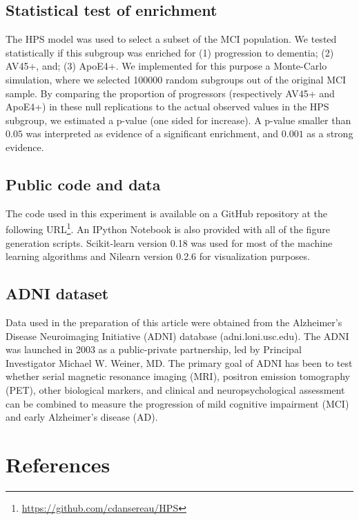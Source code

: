 \documentclass[authoryear]{elsarticle}
\begin{document}
\subsection*{Statistical test of enrichment }
The HPS model was used to select a subset of the MCI population. We tested statistically if this subgroup was enriched for (1) progression to dementia; (2) AV45+, and; (3) ApoE4+. We implemented for this purpose a Monte-Carlo simulation, where we selected 100000 random subgroups out of the original MCI sample. By comparing the proportion of progressors (respectively AV45+ and ApoE4+) in these null replications to the actual observed values in the HPS subgroup, we estimated a p-value \citep{Phipson2010} (one sided for increase). A p-value smaller than $0.05$ was interpreted as evidence of a significant enrichment, and $0.001$ as a strong evidence.
\subsection*{Public code and data}
The code used in this experiment is available on a 
GitHub repository at the following URL\footnote{\url{https://github.com/cdansereau/HPS}}. An IPython Notebook is also provided with all of the figure generation scripts. Scikit-learn \cite{scikit-learn} version 0.18 was used for most of the machine learning algorithms and Nilearn \cite{Abraham2014} version 0.2.6 for visualization purposes.
\subsection*{ADNI dataset}
Data used in the preparation of this article were obtained from the Alzheimer's Disease Neuroimaging Initiative (ADNI) database (adni.loni.usc.edu). The ADNI was launched in 2003 as a public-private partnership, led by Principal Investigator Michael W. Weiner, MD. The primary goal of ADNI has been to test whether serial magnetic resonance imaging (MRI), positron emission tomography (PET), other biological markers, and clinical and neuropsychological assessment can be combined to measure the progression of mild cognitive impairment (MCI) and early Alzheimer's disease (AD).
\section*{References}





\pagebreak
\end{document}
